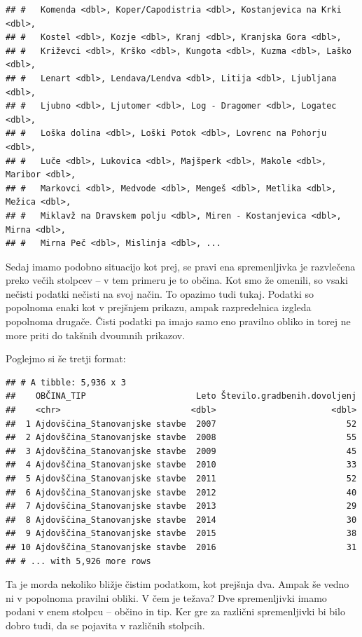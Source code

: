 \documentclass[
]{book}
\begin{document}
\begin{verbatim}
## #   Komenda <dbl>, Koper/Capodistria <dbl>, Kostanjevica na Krki <dbl>,
## #   Kostel <dbl>, Kozje <dbl>, Kranj <dbl>, Kranjska Gora <dbl>,
## #   Križevci <dbl>, Krško <dbl>, Kungota <dbl>, Kuzma <dbl>, Laško <dbl>,
## #   Lenart <dbl>, Lendava/Lendva <dbl>, Litija <dbl>, Ljubljana <dbl>,
## #   Ljubno <dbl>, Ljutomer <dbl>, Log - Dragomer <dbl>, Logatec <dbl>,
## #   Loška dolina <dbl>, Loški Potok <dbl>, Lovrenc na Pohorju <dbl>,
## #   Luče <dbl>, Lukovica <dbl>, Majšperk <dbl>, Makole <dbl>, Maribor <dbl>,
## #   Markovci <dbl>, Medvode <dbl>, Mengeš <dbl>, Metlika <dbl>, Mežica <dbl>,
## #   Miklavž na Dravskem polju <dbl>, Miren - Kostanjevica <dbl>, Mirna <dbl>,
## #   Mirna Peč <dbl>, Mislinja <dbl>, ...
\end{verbatim}

Sedaj imamo podobno situacijo kot prej, se pravi ena spremenljivka je razvlečena preko večih stolpcev -- v tem primeru je to občina. Kot smo že omenili, so vsaki nečisti podatki nečisti na svoj način. To opazimo tudi tukaj. Podatki so popolnoma enaki kot v prejšnjem prikazu, ampak razpredelnica izgleda popolnoma drugače. Čisti podatki pa imajo samo eno pravilno obliko in torej ne more priti do takšnih dvoumnih prikazov.

Poglejmo si še tretji format:

\begin{verbatim}
## # A tibble: 5,936 x 3
##    OBČINA_TIP                      Leto Število.gradbenih.dovoljenj
##    <chr>                          <dbl>                       <dbl>
##  1 Ajdovščina_Stanovanjske stavbe  2007                          52
##  2 Ajdovščina_Stanovanjske stavbe  2008                          55
##  3 Ajdovščina_Stanovanjske stavbe  2009                          45
##  4 Ajdovščina_Stanovanjske stavbe  2010                          33
##  5 Ajdovščina_Stanovanjske stavbe  2011                          52
##  6 Ajdovščina_Stanovanjske stavbe  2012                          40
##  7 Ajdovščina_Stanovanjske stavbe  2013                          29
##  8 Ajdovščina_Stanovanjske stavbe  2014                          30
##  9 Ajdovščina_Stanovanjske stavbe  2015                          38
## 10 Ajdovščina_Stanovanjske stavbe  2016                          31
## # ... with 5,926 more rows
\end{verbatim}

Ta je morda nekoliko bližje čistim podatkom, kot prejšnja dva. Ampak še vedno ni v popolnoma pravilni obliki. V čem je težava? Dve spremenljivki imamo podani v enem stolpcu -- občino in tip. Ker gre za različni spremenljivki bi bilo dobro tudi, da se pojavita v različnih stolpcih.
\end{document}
